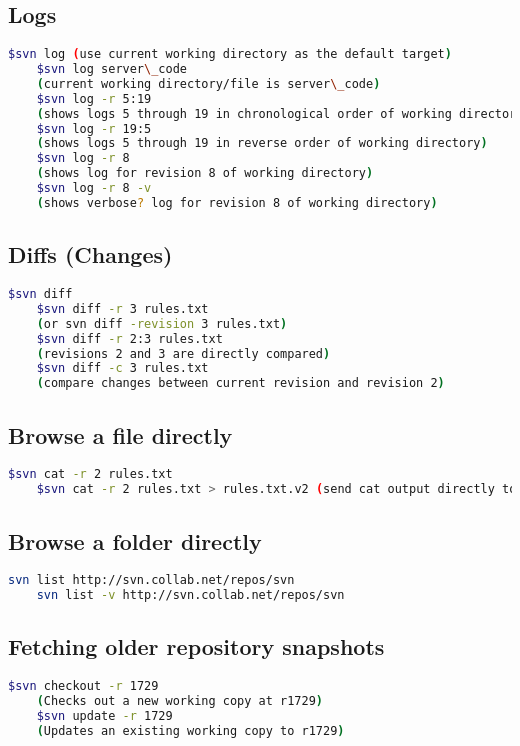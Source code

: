 \documentclass{article}
\begin{document}
\subsection{Logs}
\begin{lstlisting}[language=BASH]
    $svn log (use current working directory as the default target)
    $svn log server\_code
    (current working directory/file is server\_code)
    $svn log -r 5:19
    (shows logs 5 through 19 in chronological order of working directory)
    $svn log -r 19:5
    (shows logs 5 through 19 in reverse order of working directory)
    $svn log -r 8
    (shows log for revision 8 of working directory)
    $svn log -r 8 -v
    (shows verbose? log for revision 8 of working directory) 
\end{lstlisting}

\subsection{Diffs (Changes)}
\begin{lstlisting}[language=BASH]
    $svn diff
    $svn diff -r 3 rules.txt
    (or svn diff -revision 3 rules.txt)
    $svn diff -r 2:3 rules.txt
    (revisions 2 and 3 are directly compared)
    $svn diff -c 3 rules.txt
    (compare changes between current revision and revision 2) 
\end{lstlisting}

\subsection{Browse a file directly}
\begin{lstlisting}[language=BASH]
    $svn cat -r 2 rules.txt
    $svn cat -r 2 rules.txt > rules.txt.v2 (send cat output directly to a file) 
\end{lstlisting}

\subsection{Browse a folder directly}
\begin{lstlisting}[language=BASH]
    svn list http://svn.collab.net/repos/svn
    svn list -v http://svn.collab.net/repos/svn 
\end{lstlisting}

\subsection{Fetching older repository snapshots}
\begin{lstlisting}[language=BASH]
    $svn checkout -r 1729
    (Checks out a new working copy at r1729)
    $svn update -r 1729
    (Updates an existing working copy to r1729) 
\end{lstlisting}
\end{document}
